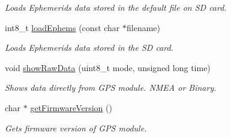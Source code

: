 \begin{DoxyCompactItemize}
\begin{DoxyCompactList}\small\item\em Loads Ephemerids data stored in the default file on SD card. \end{DoxyCompactList}\item 
int8\+\_\+t \hyperlink{class_wasp_g_p_s_a8b4a945a2630e01643ef8ca67af74a4b}{load\+Ephems} (const char $\ast$filename)
\begin{DoxyCompactList}\small\item\em Loads Ephemerids data stored in the SD card. \end{DoxyCompactList}\item 
void \hyperlink{class_wasp_g_p_s_a3ef86d4c2d4d128c2b8eca9d102208d5}{show\+Raw\+Data} (uint8\+\_\+t mode, unsigned long time)
\begin{DoxyCompactList}\small\item\em Shows data directly from G\+PS module. N\+M\+EA or Binary. \end{DoxyCompactList}\item 
char $\ast$ \hyperlink{class_wasp_g_p_s_af5ee3ced200f8d5e71d1191c0cabd4ef}{get\+Firmware\+Version} ()
\begin{DoxyCompactList}\small\item\em Gets firmware version of G\+PS module. \end{DoxyCompactList}\end{DoxyCompactItemize}
